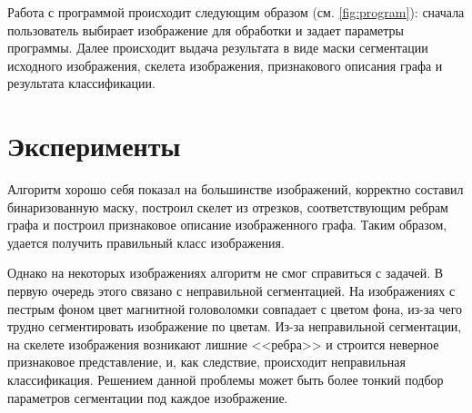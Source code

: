 \documentclass[11pt]{extarticle}
\begin{document}
Работа с программой происходит следующим образом (см. \autoref{fig:program}): сначала пользователь выбирает изображение для обработки и задает параметры программы.
Далее происходит выдача результата в виде маски сегментации исходного изображения, скелета изображения, признакового описания графа и результата классификации.

\section{Эксперименты}

Алгоритм хорошо себя показал на большинстве изображений, корректно составил бинаризованную маску, построил скелет из отрезков, соответствующим ребрам графа и построил признаковое описание изображенного графа. Таким образом, удается получить правильный класс изображения.

Однако на некоторых изображениях алгоритм не смог справиться с задачей. В первую очередь этого связано с неправильной сегментацией. На изображениях с пестрым фоном цвет магнитной головоломки совпадает с цветом фона, из-за чего трудно сегментировать изображение по цветам. Из-за неправильной сегментации, на скелете изображения возникают лишние <<ребра>> и строится неверное признаковое представление, и, как следствие, происходит неправильная классификация. Решением данной проблемы может быть более тонкий подбор параметров сегментации под каждое изображение.
\end{document}
